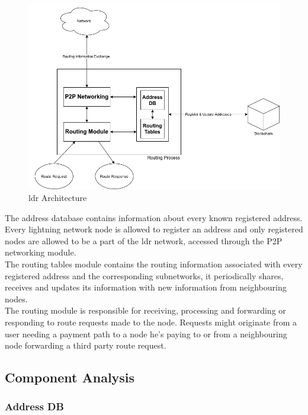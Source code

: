 \begin{figure}[H]
\begin{center}
  \includegraphics[width=0.9\linewidth]{images/architecture.png}
  \caption{\acrshort{ldr} Architecture}
  \label{fig:architecture}
  \end{center}
\end{figure}

The address database contains information about every known registered address. Every lightning network node is allowed to register an address and only registered nodes are allowed to be a part of the \acrshort{ldr} network, accessed through the P2P networking module. \\
The routing tables module contains the routing information associated with every registered address and the corresponding subnetworks, it periodically shares, receives and updates its information with new information from neighbouring nodes. \\
The routing module is responsible for receiving, processing and forwarding or responding to route requests made to the node. Requests might originate from a user needing a payment path to a node he's paying to or from a neighbouring node forwarding a third party route request.

\subsection{Component Analysis}
\label{ssec:component_analysis}
\subsubsection{Address DB}

